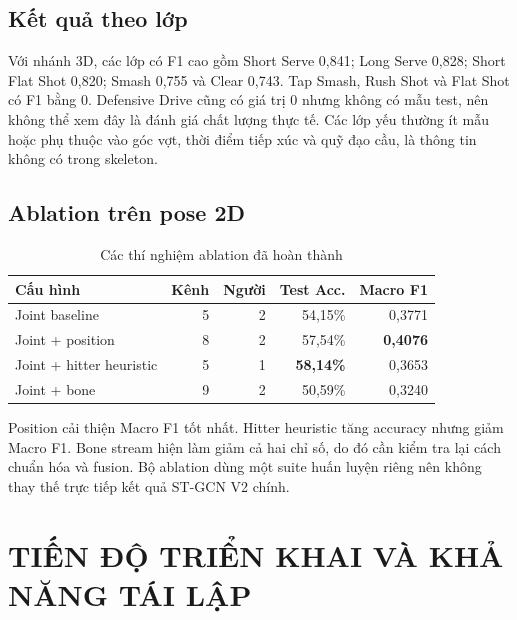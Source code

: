 \documentclass[12pt,a4paper,oneside]{report}
\begin{document}
\section{Kết quả theo lớp}

Với nhánh 3D, các lớp có F1 cao gồm Short Serve 0,841; Long Serve 0,828; Short Flat Shot 0,820; Smash 0,755 và Clear 0,743. Tap Smash, Rush Shot và Flat Shot có F1 bằng 0. Defensive Drive cũng có giá trị 0 nhưng không có mẫu test, nên không thể xem đây là đánh giá chất lượng thực tế. Các lớp yếu thường ít mẫu hoặc phụ thuộc vào góc vợt, thời điểm tiếp xúc và quỹ đạo cầu, là thông tin không có trong skeleton.

\section{Ablation trên pose 2D}

\begin{table}[H]
\centering
\caption{Các thí nghiệm ablation đã hoàn thành}
\begin{tabular}{lrrrr}
\toprule
\textbf{Cấu hình} & \textbf{Kênh} & \textbf{Người} &
\textbf{Test Acc.} & \textbf{Macro F1}\\
\midrule
Joint baseline & 5 & 2 & 54,15\% & 0,3771\\
Joint + position & 8 & 2 & 57,54\% & \textbf{0,4076}\\
Joint + hitter heuristic & 5 & 1 & \textbf{58,14\%} & 0,3653\\
Joint + bone & 9 & 2 & 50,59\% & 0,3240\\
\bottomrule
\end{tabular}
\end{table}

Position cải thiện Macro F1 tốt nhất. Hitter heuristic tăng accuracy nhưng giảm Macro F1. Bone stream hiện làm giảm cả hai chỉ số, do đó cần kiểm tra lại cách chuẩn hóa và fusion. Bộ ablation dùng một suite huấn luyện riêng nên không thay thế trực tiếp kết quả ST-GCN V2 chính.


\chapter{TIẾN ĐỘ TRIỂN KHAI VÀ KHẢ NĂNG TÁI LẬP}
\end{document}
